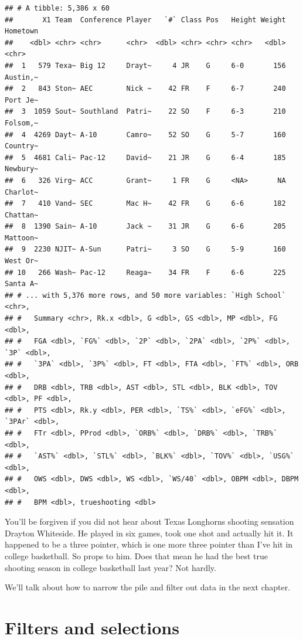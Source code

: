 \documentclass[
]{book}
\begin{document}
\begin{verbatim}
## # A tibble: 5,386 x 60
##       X1 Team  Conference Player   `#` Class Pos   Height Weight Hometown
##    <dbl> <chr> <chr>      <chr>  <dbl> <chr> <chr> <chr>   <dbl> <chr>   
##  1   579 Texa~ Big 12     Drayt~     4 JR    G     6-0       156 Austin,~
##  2   843 Ston~ AEC        Nick ~    42 FR    F     6-7       240 Port Je~
##  3  1059 Sout~ Southland  Patri~    22 SO    F     6-3       210 Folsom,~
##  4  4269 Dayt~ A-10       Camro~    52 SO    G     5-7       160 Country~
##  5  4681 Cali~ Pac-12     David~    21 JR    G     6-4       185 Newbury~
##  6   326 Virg~ ACC        Grant~     1 FR    G     <NA>       NA Charlot~
##  7   410 Vand~ SEC        Mac H~    42 FR    G     6-6       182 Chattan~
##  8  1390 Sain~ A-10       Jack ~    31 JR    G     6-6       205 Mattoon~
##  9  2230 NJIT~ A-Sun      Patri~     3 SO    G     5-9       160 West Or~
## 10   266 Wash~ Pac-12     Reaga~    34 FR    F     6-6       225 Santa A~
## # ... with 5,376 more rows, and 50 more variables: `High School` <chr>,
## #   Summary <chr>, Rk.x <dbl>, G <dbl>, GS <dbl>, MP <dbl>, FG <dbl>,
## #   FGA <dbl>, `FG%` <dbl>, `2P` <dbl>, `2PA` <dbl>, `2P%` <dbl>, `3P` <dbl>,
## #   `3PA` <dbl>, `3P%` <dbl>, FT <dbl>, FTA <dbl>, `FT%` <dbl>, ORB <dbl>,
## #   DRB <dbl>, TRB <dbl>, AST <dbl>, STL <dbl>, BLK <dbl>, TOV <dbl>, PF <dbl>,
## #   PTS <dbl>, Rk.y <dbl>, PER <dbl>, `TS%` <dbl>, `eFG%` <dbl>, `3PAr` <dbl>,
## #   FTr <dbl>, PProd <dbl>, `ORB%` <dbl>, `DRB%` <dbl>, `TRB%` <dbl>,
## #   `AST%` <dbl>, `STL%` <dbl>, `BLK%` <dbl>, `TOV%` <dbl>, `USG%` <dbl>,
## #   OWS <dbl>, DWS <dbl>, WS <dbl>, `WS/40` <dbl>, OBPM <dbl>, DBPM <dbl>,
## #   BPM <dbl>, trueshooting <dbl>
\end{verbatim}

You'll be forgiven if you did not hear about Texas Longhorns shooting sensation Drayton Whiteside. He played in six games, took one shot and actually hit it. It happened to be a three pointer, which is one more three pointer than I've hit in college basketball. So props to him. Does that mean he had the best true shooting season in college basketball last year? Not hardly.

We'll talk about how to narrow the pile and filter out data in the next chapter.

\hypertarget{filters-and-selections}{%
\chapter{Filters and selections}\label{filters-and-selections}}
\end{document}
